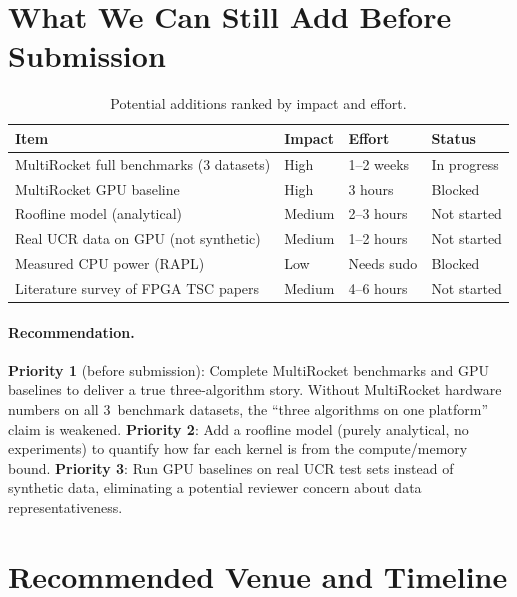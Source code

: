 \documentclass[11pt]{article}
\begin{document}
\section{What We Can Still Add Before Submission}

\begin{table}[H]
\centering
\caption{Potential additions ranked by impact and effort.}
\label{tab:additions}
\small
\footnotesize
\begin{tabularx}{\textwidth}{Xlll}
\toprule
\textbf{Item} & \textbf{Impact} & \textbf{Effort} & \textbf{Status} \\
\midrule
MultiRocket full benchmarks (3 datasets) & High & 1--2 weeks & In progress \\
MultiRocket GPU baseline & High & 3 hours & Blocked \\
Roofline model (analytical) & Medium & 2--3 hours & Not started \\
Real UCR data on GPU (not synthetic) & Medium & 1--2 hours & Not started \\
Measured CPU power (RAPL) & Low & Needs sudo & Blocked \\
Literature survey of FPGA TSC papers & Medium & 4--6 hours & Not started \\
\bottomrule
\end{tabularx}
\end{table}

\paragraph{Recommendation.}
\textbf{Priority 1} (before submission): Complete MultiRocket benchmarks and GPU baselines
to deliver a true three-algorithm story. Without MultiRocket hardware numbers on all
3~benchmark datasets, the ``three algorithms on one platform'' claim is weakened.
\textbf{Priority 2}: Add a roofline model (purely analytical, no experiments) to
quantify how far each kernel is from the compute/memory bound.
\textbf{Priority 3}: Run GPU baselines on real UCR test sets instead of synthetic data,
eliminating a potential reviewer concern about data representativeness.

\section{Recommended Venue and Timeline}
\end{document}
